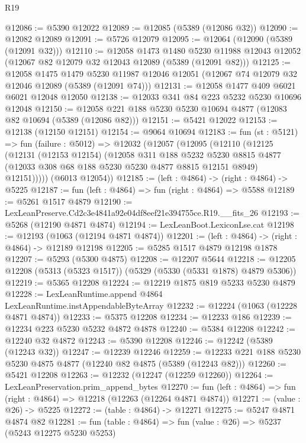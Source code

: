 \begin{lexlean}{R19}
\begin{coremodule}
@12086 := @5390 @12022
@12089 := @12085 (@5389 (@12086 @32))
@12090 := @12082 @12089
@12091 := @5726 @12079
@12095 := @12064 (@12090 (@5389 (@12091 @32)))
@12110 := @12058
    @1473
    @1480
    @5230
    @11988
    @12043
    @12052
    (@12067 @82 @12079 @32 @12043 @12089 (@5389 (@12091 @82)))
@12125 := @12058
    @1475
    @1479
    @5230
    @11987
    @12046
    @12051
    (@12067 @74 @12079 @32 @12046 @12089 (@5389 (@12091 @74)))
@12131 := @12058 @1477 @409 @6021 @6021 @12048 @12050
@12138 := @12033 @341 @84 @223 @5232 @5230 @10696 @12048
@12150 := @12058 @221 @188 @5230 @5230 @10694 @4877 (@12083 @82 @10694 (@5389 (@12086 @82)))
@12151 := @5421 @12022
@12153 := @12138 (@12150 @12151)
@12154 := @9064 @10694
@12183 := fun (st : @5121) =>
  fun (failure : @5012) =>
  @12032
    (@12057
      (@12095
        (@12110
          (@12125
            (@12131
              (@12153 @12154)
              (@12058
                @311
                @188
                @5232
                @5230
                @8815
                @4877
                (@12033 @308 @68 @188 @5230 @5230 @4877 @8815 @12151 @8949)
                @12151)))))
      (@6013 @12054))
@12185 := (left : @4864) -> (right : @4864) -> @5225
@12187 := fun (left : @4864) => fun (right : @4864) => @5588
@12189 := @5261 @1517 @4879
@12190 := LexLeanPreserve.Cd2c3e4841a92e04df8eef21e394755ce.R19.__fits_26
@12193 := @5268 (@12190 @4871 @4874)
@12194 := LexLeanBoot.LexiconLse.cat
@12198 := @12193 (@1063 (@12194 @4871 @4874))
@12201 := (left : @4864) -> (right : @4864) -> @12189 @12198
@12205 := @5285 @1517 @4879 @12198 @1878
@12207 := @5293 (@5300 @4875)
@12208 := @12207 @5644
@12218 := @12205 @12208 (@5313 (@5323 @1517)) (@5329 (@5330 (@5331 @1878) @4879 @5306))
@12219 := @5365 @12208
@12224 := @12219 @1875 @819 @5233 @5230 @4879
@12228 := LexLeanRuntime.append @4864 LexLeanRuntime.instAppendableByteArray
@12232 := @12224 (@1063 (@12228 @4871 @4874))
@12233 := @5375 @12208
@12234 := @12233 @186
@12239 := @12234 @223 @5230 @5232 @4872 @4878
@12240 := @5384 @12208
@12242 := @12240 @32 @4872
@12243 := @5390 @12208
@12246 := @12242 (@5389 (@12243 @32))
@12247 := @12239 @12246
@12259 := @12233 @221 @188 @5230 @5230 @4875 @4877 (@12240 @82 @4875 (@5389 (@12243 @82)))
@12260 := @5421 @12208
@12263 := @12232 (@12247 (@12259 @12260))
@12264 := LexLeanPreservation.prim_append_bytes
@12270 := fun (left : @4864) => fun (right : @4864) => @12218 (@12263 (@12264 @4871 @4874))
@12271 := (value : @26) -> @5225
@12272 := (table : @4864) -> @12271
@12275 := @5247 @4871 @4874 @82
@12281 := fun (table : @4864) => fun (value : @26) => @5237 (@5243 @12275 @5230 @5253)

\end{coremodule}
\end{lexlean}
